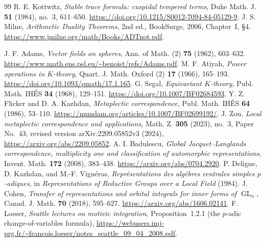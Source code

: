 \documentclass[11pt]{article}
\newcommand{\GL}{\operatorname{GL}}
\theoremstyle{plain}
\theoremstyle{definition}
\begin{document}
\begin{thebibliography}{99}
 R. E. Kottwitz, \emph{Stable trace formula: cuspidal tempered terms},
Duke Math. J. \textbf{51} (1984), no.~3, 611--650.
\url{https://doi.org/10.1215/S0012-7094-84-05129-9}.
 J. S. Milne, \emph{Arithmetic Duality Theorems}, 2nd ed.,
BookSurge, 2006, Chapter~I, \S4.
\url{https://www.jmilne.org/math/Books/ADTnot.pdf}.

 J. F. Adams, \emph{Vector fields on spheres}, Ann. of Math.
(2) \textbf{75} (1962), 603--632.
\url{https://www.math.ens.psl.eu/~benoist/refs/Adams.pdf}.
 M. F. Atiyah, \emph{Power operations in $K$-theory},
Quart. J. Math. Oxford (2) \textbf{17} (1966), 165--193.
\url{https://doi.org/10.1093/qmath/17.1.165}.
 G. Segal, \emph{Equivariant $K$-theory},
Publ. Math. IH\'ES \textbf{34} (1968), 129--151.
\url{https://doi.org/10.1007/BF02684593}.
 Y. Z. Flicker and D. A. Kazhdan, \emph{Metaplectic correspondence}, Publ. Math. IH\'ES \textbf{64} (1986), 53--110. \url{https://numdam.org/articles/10.1007/BF02699192/}.
 J. Zou, \emph{Local metaplectic correspondence and applications}, Math. Z. \textbf{305} (2023), no.~3, Paper No.~43; revised version arXiv:2209.05852v3 (2024), \url{https://arxiv.org/abs/2209.05852}.
 A. I. Badulescu, \emph{Global Jacquet--Langlands correspondence, multiplicity one and classification of automorphic representations}, Invent. Math. \textbf{172} (2008), 383--438. \url{https://arxiv.org/abs/0704.2920}.
 P. Deligne, D. Kazhdan, and M.-F. Vign\'eras, \emph{Repr\'esentations des alg\`ebres centrales simples $p$-adiques}, in \emph{Representations of Reductive Groups over a Local Field} (1984).
 J. Cohen, \emph{Transfer of representations and orbital integrals for inner forms of $\GL_n$}, Canad. J. Math. \textbf{70} (2018), 595--627. \url{https://arxiv.org/abs/1606.02141}.
 F. Loeser, \emph{Seattle lectures on motivic integration},
Proposition~1.2.1 (the $p$-adic change-of-variables formula),
\url{https://webusers.imj-prg.fr/~francois.loeser/notes_seattle_09_04_2008.pdf}.
\end{thebibliography}
\end{document}

